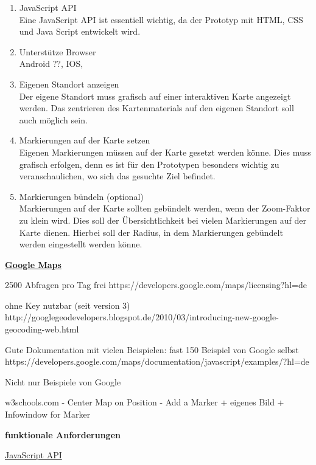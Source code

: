 \begin{enumerate}
\item JavaScript API\\
Eine JavaScript API ist essentiell wichtig, da der Prototyp mit HTML, CSS und Java Script entwickelt wird. 

\item Unterstütze Browser\\
Android ??, IOS, 

\item Eigenen Standort anzeigen\\
Der eigene Standort muss grafisch auf einer interaktiven Karte angezeigt werden. Das zentrieren des Kartenmaterials auf den eigenen Standort soll auch möglich sein.

\item Markierungen auf der Karte setzen\\
Eigenen Markierungen müssen auf der Karte gesetzt werden könne. Dies muss grafisch erfolgen, denn es ist für den Prototypen besonders wichtig zu veranschaulichen, wo sich das gesuchte Ziel befindet. 

\item Markierungen bündeln (optional)\\
Markierungen auf der Karte sollten gebündelt werden, wenn der Zoom-Faktor zu klein wird. Dies soll der Übersichtlichkeit bei vielen Markierungen auf der Karte dienen. Hierbei soll der Radius, in dem Markierungen gebündelt werden eingestellt werden könne.

\end{enumerate}

\textbf{\underline{Google Maps}}

2500 Abfragen pro Tag frei
https://developers.google.com/maps/licensing?hl=de

ohne Key nutzbar (seit version 3)
http://googlegeodevelopers.blogspot.de/2010/03/introducing-new-google-geocoding-web.html

Gute Dokumentation mit vielen Beispielen:
fast 150 Beispiel von Google selbst
https://developers.google.com/maps/documentation/javascript/examples/?hl=de

Nicht nur Beispiele von Google 

w3schools.com
- Center Map on Position
- Add a Marker + eigenes Bild + Infowindow for Marker






\textbf{funktionale Anforderungen}

\underline{JavaScript API}

